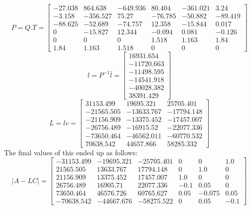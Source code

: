 \begin{equation}
  P = Q.T = \left[\begin{matrix}-27.038 & 864.638 & -649.936 & 80.404 & -361.021 & 3.24\\-3.158 & -356.527 & 75.27 & -76.785 & -50.882 & -89.419\\-88.625 & -52.689 & -74.757 & 12.358 & -15.844 & 0.017\\0 & -15.827 & 12.344 & -0.094 & 0.081 & -0.126\\0 & 0 & 0 & 1.518 & 1.163 & 1.84\\1.84 & 1.163 & 1.518 & 0 & 0 & 0\end{matrix}\right]
\end{equation}
\begin{equation}
  l = P^{-1} \bar l  = \left[\begin{matrix}16931.654\\-11720.663\\-11498.595\\-14541.918\\-40028.382\\38391.429\end{matrix}\right]
\end{equation}
\begin{equation}
  L = lv  = \left[\begin{matrix}31153.499 & 19695.321 & 25705.401\\-21565.505 & -13633.767 & -17794.148\\-21156.909 & -13375.452 & -17457.007\\-26756.489 & -16915.52 & -22077.336\\-73650.464 & -46562.011 & -60770.532\\70638.542 & 44657.866 & 58285.332\end{matrix}\right]
\end{equation}
The final values of this ended up as follows: 
\begin{equation}
\vert A-LC \vert = 
\left[\begin{matrix}-31153.499 & -19695.321 & -25705.401 & 0 & 0 & 1.0\\21565.505 & 13633.767 & 17794.148 & 0 & 1.0 & 0\\21156.909 & 13375.452 & 17457.007 & 1.0 & 0 & 0\\26756.489 & 16905.71 & 22077.336 & -0.1 & 0.05 & 0\\73650.464 & 46576.726 & 60765.627 & 0.05 & -0.075 & 0.05\\-70638.542 & -44667.676 & -58275.522 & 0 & 0.05 & -0.1\end{matrix}\right]\end{equation}
